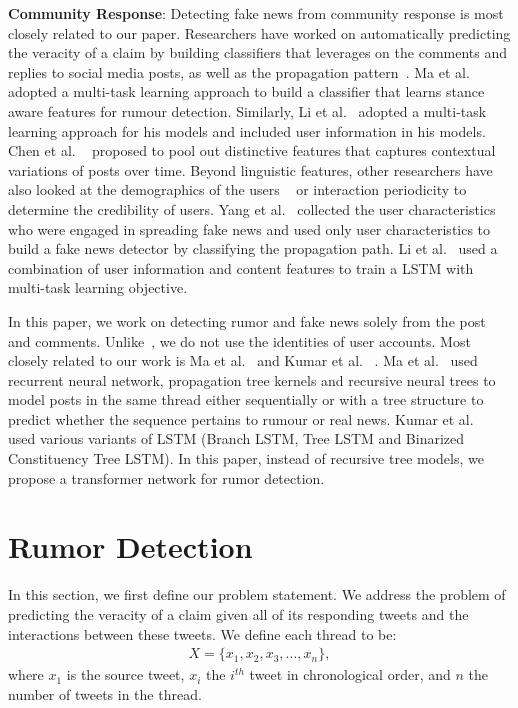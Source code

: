 \documentclass[letterpaper]{article} %
\begin{document}
\textbf{Community Response}:
Detecting fake news from community response is most closely related to our paper. Researchers have worked on automatically predicting the veracity of a claim by building classifiers that leverages on the comments and replies to social media posts, as well as the propagation pattern~\cite{omar17,castillo11,ma17,ma18}. Ma et al.~ adopted a multi-task learning approach to build a classifier that learns stance aware features for rumour detection. Similarly, Li et al.~ adopted a multi-task learning approach for his models and included user information in his models. Chen et al. ~ proposed to pool out distinctive features that captures contextual variations of posts over time. Beyond linguistic features, other researchers have also looked at the demographics of the users ~\cite{yang12,li-etal-2019-rumor} or interaction periodicity \cite{kwon13a} to determine the credibility of users. Yang et al.~ collected the user characteristics who were engaged in spreading fake news and used only user characteristics to build a fake news detector by classifying the propagation path. Li et al.~ used a combination of user information and content features to train a LSTM with multi-task learning objective.

In this paper, we work on detecting rumor and fake news solely from the post and comments. Unlike~\citet{li-etal-2019-rumor,yang12}, we do not use the identities of user accounts. Most closely related to our work is Ma et al.~ and Kumar et al. ~. Ma et al.~ used recurrent neural network, propagation tree kernels and recursive neural trees to model posts in the same thread either sequentially or with a tree structure to predict whether the sequence pertains to rumour or real news. Kumar et al.~ used various variants of LSTM (Branch LSTM, Tree LSTM and Binarized
Constituency Tree LSTM). In this paper, instead of recursive tree models, we propose a transformer network for rumor detection.

\section{Rumor Detection} \label{motivation_and_analysis}

In this section, we first define our problem statement. We address the problem of predicting the veracity of a claim given all of its responding tweets and the interactions between these tweets. We define each thread to be:
\begin{eqnarray*}
X = \{x_1, x_{2}, x_{3}, ... , x_{n}\},
\end{eqnarray*}
where $x_1$ is the source tweet, $x_{i}$ the $i^{th}$ tweet in chronological order, and $n$ the number of tweets in the thread. 
\end{document}
